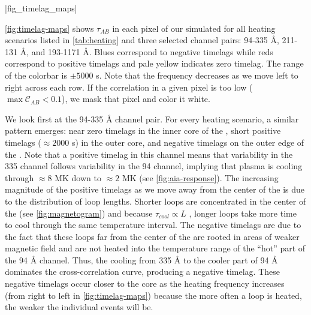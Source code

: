 |fig_timelag_maps|

\autoref{fig:timelag-maps} shows $\tau_{AB}$ in each pixel of our simulated \AR{} for all heating scenarios listed in \autoref{tab:heating} and three selected channel pairs: 94-335 \AA{}, 211-131 \AA{}, and 193-1171 \AA{}. Blues correspond to negative timelags while reds correspond to positive timelags and pale yellow indicates zero timelag. The range of the colorbar is $\pm5000$ s. Note that the frequency decreases as we move left to right across each row. If the correlation in a given pixel is too low ($\max{\mathcal{C}_{AB}}<0.1$), we mask that pixel and color it white. 

We look first at the 94-335 \AA{} channel pair. For every heating scenario, a similar pattern emerges: near zero timelags in the inner core of the \AR{}, short positive timelags ($\approx2000$ s) in the outer core, and negative timelags on the outer edge of the \AR{}. Note that a positive timelag in this channel means that variability in the 335 channel follows variability in the 94 channel, implying that plasma is cooling through $\approx8$ MK down to $\approx2$ MK (see \autoref{fig:aia-response}). The increasing magnitude of the positive timelags as we move away from the center of the \AR{} is due to the distribution of loop lengths. Shorter loops are concentrated in the center of the \AR{} (see \autoref{fig:magnetogram}) and because $\tau_{cool}\propto L$ \citep[see Appendix of][]{cargill_active_2014}, longer loops take more time to cool through the same temperature interval. The negative timelags are due to the fact that these loops far from the center of the \AR{} are rooted in areas of weaker magnetic field and are not heated into the temperature range of the ``hot'' part of the 94 \AA{} channel. Thus, the cooling from 335 \AA{} to the cooler part of 94 \AA{} dominates the cross-correlation curve, producing a negative timelag. These negative timelags occur closer to the core as the heating frequency increases (from right to left in \autoref{fig:timelag-maps}) because the more often a loop is heated, the weaker the individual events will be. 

